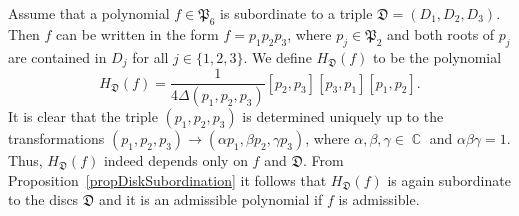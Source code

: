 \documentclass{amsart}
\numberwithin{equation}{section}
\theoremstyle{definition}
\theoremstyle{remark}
\DeclareMathOperator{\CC}{\mathbb C}
\begin{document}
	Assume that a polynomial $f \in \mathfrak P_6$ is subordinate to a triple $\mathfrak D = (D_1,D_2,D_3)$. Then $f$ can be written in the form $f = p_1p_2p_3$, where $p_j \in \mathfrak P_2$ and both roots of $p_j$ are contained in $D_j$ for all $j \in \{1,2,3\}$. We define $H_{\mathfrak D}(f)$ to be the polynomial
	\[
	H_{\mathfrak D}(f) = \frac{1}{4\Delta(p_1,p_2,p_3)}[p_2, p_3][p_3, p_1][p_1, p_2].
	\]
	It is clear that the triple $(p_1,p_2,p_3)$ is determined uniquely up to the transformations $(p_1,p_2,p_3) \to (\alpha p_1, \beta p_2, \gamma p_3)$, where $\alpha, \beta, \gamma \in \CC$ and $\alpha\beta\gamma = 1$. Thus, $H_{\mathfrak D}(f)$ indeed depends only on $f$ and $\mathfrak D$. From Proposition~\ref{propDiskSubordination} it follows that $H_{\mathfrak D}(f)$ is again subordinate to the discs $\mathfrak D$ and it is an admissible polynomial if $f$ is admissible.
	
\end{document}

